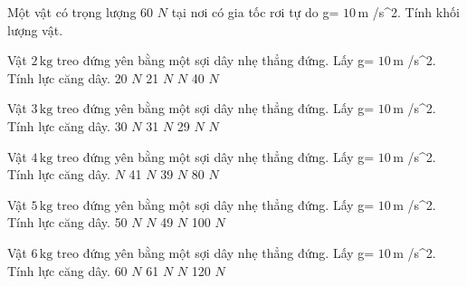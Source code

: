 \begin{bt}
Một vật có trọng lượng 60 $N$ tại nơi có gia tốc rơi tự do g= $10\,\text{m}$ /s^2. Tính khối lượng vật.
\end{bt}

\begin{ex}
Vật $2\,\text{kg}$ treo đứng yên bằng một sợi dây nhẹ thẳng đứng. Lấy g= $10\,\text{m}$ /s^2. Tính lực căng dây.
\choice
{20 $N$}
{21 $N$}
{ $N$}
{40 $N$}
\end{ex}

\begin{ex}
Vật $3\,\text{kg}$ treo đứng yên bằng một sợi dây nhẹ thẳng đứng. Lấy g= $10\,\text{m}$ /s^2. Tính lực căng dây.
\choice
{30 $N$}
{31 $N$}
{29 $N$}
{ $N$}
\end{ex}

\begin{ex}
Vật $4\,\text{kg}$ treo đứng yên bằng một sợi dây nhẹ thẳng đứng. Lấy g= $10\,\text{m}$ /s^2. Tính lực căng dây.
\choice
{ $N$}
{41 $N$}
{39 $N$}
{80 $N$}
\end{ex}

\begin{ex}
Vật $5\,\text{kg}$ treo đứng yên bằng một sợi dây nhẹ thẳng đứng. Lấy g= $10\,\text{m}$ /s^2. Tính lực căng dây.
\choice
{50 $N$}
{ $N$}
{49 $N$}
{100 $N$}
\end{ex}

\begin{ex}
Vật $6\,\text{kg}$ treo đứng yên bằng một sợi dây nhẹ thẳng đứng. Lấy g= $10\,\text{m}$ /s^2. Tính lực căng dây.
\choice
{60 $N$}
{61 $N$}
{ $N$}
{120 $N$}
\end{ex}

